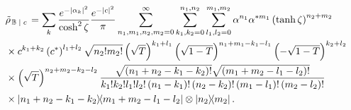 \begin{align}\label{eqn:appendix_ec_state}
&\tilde{\rho}_{\left. \mathbb{B} \given c\right.} = \sum_k\frac{e^{- \left|\alpha_k\right|^2}}{\cosh^2 \zeta}\frac{e^{-\left|c\right|^2}}{\pi} \sum_{n_1, m_1, n_2, m_2=0}^\infty \sum_{k_1, k_2 = 0}^{n_1, n_2} \sum_{l_1, l_2 = 0}^{m_1, m_2} \alpha^{n_1} \alpha^{* m_1} \left(\tanh{\zeta}\right)^{n_2 + m_2} \notag \\
%
&\times c^{k_1 + k_2} \left(c^*\right)^{l_1 + l_2} \sqrt{n_2! m_2!} \left(\sqrt{T}\right)^{k_1 + l_1} \left(\sqrt{1-T}\right)^{n_1 + m_1 - k_1 - l_1} \left(- \sqrt{1-T}\right)^{k_2 + l_2} \notag \\ %
&\times \left( \sqrt{T}\right)^{n_2 + m_2 - k_2 - l_2}
\frac{\sqrt{\left(n_1 + n_2 - k_1 - k_2\right)!} \sqrt{\left(m_1 + m_2 - l_1 - l_2\right)!}}{k_1! k_2! l_1! l_2! \left(n_1 - k_1\right)! \left(n_2 - k_2\right)! \left(m_1 - l_1\right)! \left(m_2 - l_2\right)!} \notag \\
%
&\times \dyad{n_1 + n_2 - k_1 - k_2}{m_1 + m_2 - l_1 - l_2}\otimes \dyad{n_2}{m_2}.
\end{align}






%
%
%
%
%
%
%



